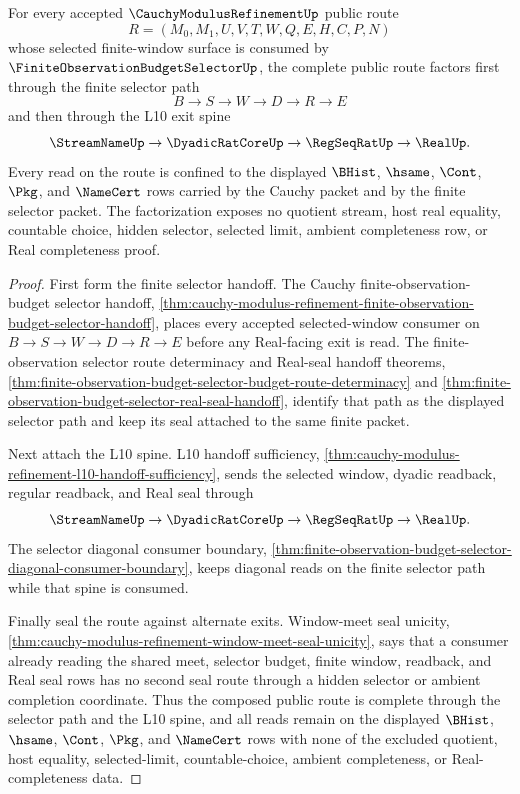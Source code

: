 \begin{theorem}
\label{thm:cauchy-modulus-refinement-selector-spine-route-completeness}
For every accepted $\CauchyModulusRefinementUp$ public route
$$
R=(M_0,M_1,U,V,T,W,Q,E,H,C,P,N)
$$
whose selected finite-window surface is consumed by
$\FiniteObservationBudgetSelectorUp$, the complete public route factors first
through the finite selector path
$$
B \to S \to W \to D \to R \to E
$$
and then through the L10 exit spine
$$
\StreamNameUp \to \DyadicRatCoreUp \to \RegSeqRatUp \to \RealUp.
$$
Every read on the route is confined to the displayed $\BHist$, $\hsame$,
$\Cont$, $\Pkg$, and $\NameCert$ rows carried by the Cauchy packet and by the
finite selector packet. The factorization exposes no quotient stream, host real
equality, countable choice, hidden selector, selected limit, ambient
completeness row, or Real completeness proof.
\end{theorem}
\begin{proof}
First form the finite selector handoff. The Cauchy finite-observation-budget
selector handoff,
\autoref{thm:cauchy-modulus-refinement-finite-observation-budget-selector-handoff},
places every accepted selected-window consumer on
$B \to S \to W \to D \to R \to E$ before any Real-facing exit is read. The
finite-observation selector route determinacy and Real-seal handoff theorems,
\autoref{thm:finite-observation-budget-selector-budget-route-determinacy} and
\autoref{thm:finite-observation-budget-selector-real-seal-handoff}, identify
that path as the displayed selector path and keep its seal attached to the same
finite packet.

Next attach the L10 spine. L10 handoff sufficiency,
\autoref{thm:cauchy-modulus-refinement-l10-handoff-sufficiency}, sends the
selected window, dyadic readback, regular readback, and Real seal through
$$
\StreamNameUp \to \DyadicRatCoreUp \to \RegSeqRatUp \to \RealUp.
$$
The selector diagonal consumer boundary,
\autoref{thm:finite-observation-budget-selector-diagonal-consumer-boundary},
keeps diagonal reads on the finite selector path while that spine is consumed.

Finally seal the route against alternate exits. Window-meet seal unicity,
\autoref{thm:cauchy-modulus-refinement-window-meet-seal-unicity}, says that a
consumer already reading the shared meet, selector budget, finite window,
readback, and Real seal rows has no second seal route through a hidden selector
or ambient completion coordinate. Thus the composed public route is complete
through the selector path and the L10 spine, and all reads remain on the
displayed $\BHist$, $\hsame$, $\Cont$, $\Pkg$, and $\NameCert$ rows with none of
the excluded quotient, host equality, selected-limit, countable-choice, ambient
completeness, or Real-completeness data.
\end{proof}


